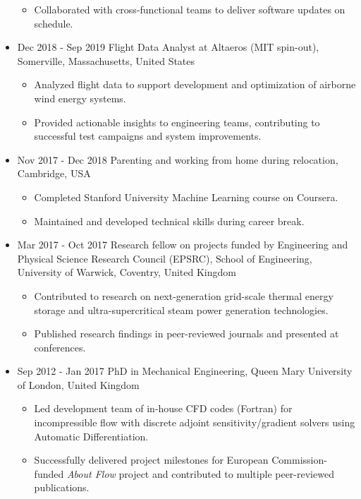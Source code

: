 \documentclass[letterpaper]{article}
\begin{document}
\begin{itemize}
\begin{itemize}
   \item Collaborated with cross-functional teams to deliver software updates on schedule.
   \end{itemize}
\item Dec 2018 - Sep 2019 \hspace{2pt} Flight Data Analyst at Altaeros (MIT spin-out), Somerville, Massachusetts, United States
  \begin{itemize}
  \item Analyzed flight data to support development and optimization of airborne wind energy systems.
  \item Provided actionable insights to engineering teams, contributing to successful test campaigns and system improvements.
  \end{itemize}
	
\item Nov 2017 - Dec 2018 \hspace{2pt} Parenting and working from home during relocation, Cambridge, USA
		\begin{itemize}
		\item Completed Stanford University Machine Learning course on Coursera.
		\item Maintained and developed technical skills during career break.
		\end{itemize}		
\item Mar 2017 - Oct 2017  \hspace{2pt} Research fellow on projects funded by Engineering and Physical Science Research Council (EPSRC), School of Engineering, University of Warwick, Coventry, United Kingdom
		\begin{itemize}
		\item Contributed to research on next-generation grid-scale thermal energy storage and ultra-supercritical steam power generation technologies.
		\item Published research findings in peer-reviewed journals and presented at conferences.
		\end{itemize}

\item Sep 2012 - Jan 2017  \hspace{2pt} PhD in Mechanical Engineering, Queen Mary University of London, United Kingdom
		\begin{itemize}
		\item Led development team of in-house CFD codes (Fortran) for incompressible flow with discrete adjoint sensitivity/gradient solvers using Automatic Differentiation.
		\item Successfully delivered project milestones for European Commission-funded \textsl{About Flow} project and contributed to multiple peer-reviewed publications.
		\end{itemize}
		

\end{itemize}
\end{document}

